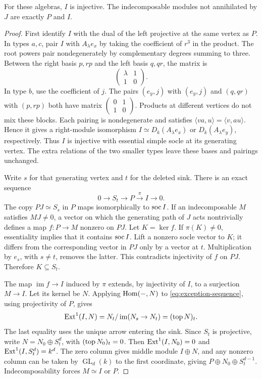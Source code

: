 \begin{lemma}\label{lem:exception-exhaustion}
For these algebras, $I$ is injective. The indecomposable modules not annihilated by $J$ are exactly $P$ and $I$.
\end{lemma}
\begin{proof}
First identify $I$ with the dual of the left projective at the same vertex as $P$. In types $a,c$, pair $I$ with $A_\lambda e_x$ by taking the coefficient of $r^3$ in the product. The root powers pair nondegenerately by complementary degrees summing to three. Between the right basis $p,rp$ and the left basis $q,qr$, the matrix is
\[
 \begin{pmatrix}\lambda&1\\1&0\end{pmatrix}.
\]
In type $b$, use the coefficient of $j$. The pairs $(e_y,j)$ with $(e_y,j)$ and $(q,qr)$ with $(p,rp)$ both have matrix $\left(\begin{smallmatrix}0&1\\1&0\end{smallmatrix}\right)$. Products at different vertices do not mix these blocks. Each pairing is nondegenerate and satisfies $\langle va,u\rangle=\langle v,au\rangle$. Hence it gives a right-module isomorphism $I\simeq D_k(A_\lambda e_x)$ or $D_k(A_\lambda e_y)$, respectively. Thus $I$ is injective with essential simple socle at its generating vertex. The extra relations of the two smaller types leave these bases and pairings unchanged.

Write $s$ for that generating vertex and $t$ for the deleted sink. There is an exact sequence
\begin{equation}\label{eq:exception-sequence}
 0\longrightarrow S_t\longrightarrow P\xrightarrow{\pi}I\longrightarrow0.
\end{equation}
The copy $PJ\simeq S_s$ in $P$ maps isomorphically to $\operatorname{soc} I$. If an indecomposable $M$ satisfies $MJ\ne0$, a vector on which the generating path of $J$ acts nontrivially defines a map $f:P\to M$ nonzero on $PJ$. Let $K=\ker f$. If $\pi(K)\ne0$, essentiality implies that it contains $\operatorname{soc} I$. Lift a nonzero socle vector to $K$; it differs from the corresponding vector in $PJ$ only by a vector at $t$. Multiplication by $e_s$, with $s\ne t$, removes the latter. This contradicts injectivity of $f$ on $PJ$. Therefore $K\subseteq S_t$.

The map $\operatorname{im}f\to I$ induced by $\pi$ extends, by injectivity of $I$, to a surjection $M\to I$. Let its kernel be $N$. Applying $\operatorname{Hom}(-,N)$ to \eqref{eq:exception-sequence}, using projectivity of $P$, gives
\begin{equation}\label{eq:exception-ext}
 \operatorname{Ext}^1(I,N)=N_t/\operatorname{im}(N_s\to N_t)= (\operatorname{top} N)_t.
\end{equation}
The last equality uses the unique arrow entering the sink. Since $S_t$ is projective, write $N=N_0\oplus S_t^d$, with $(\operatorname{top} N_0)_t=0$. Then $\operatorname{Ext}^1(I,N_0)=0$ and $\operatorname{Ext}^1(I,S_t^d)=k^d$. The zero column gives middle module $I\oplus N$, and any nonzero column can be taken by $\operatorname{GL}_d(k)$ to the first coordinate, giving $P\oplus N_0\oplus S_t^{d-1}$. Indecomposability forces $M\simeq I$ or $P$.
\end{proof}

